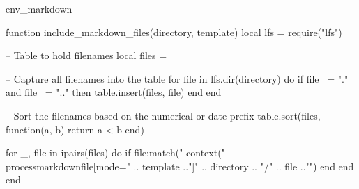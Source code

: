 \startenvironment env_markdown

\startluacode
function include_markdown_files(directory, template)
	local lfs = require("lfs")

	-- Table to hold filenames
	local files = {}

	-- Capture all filenames into the table
	for file in lfs.dir(directory) do
		if file ~= "." and file ~= ".." then
			table.insert(files, file)
		end
	end

	-- Sort the filenames based on the numerical or date prefix
	table.sort(files, function(a, b)
			return a < b
	end)

	for _, file in ipairs(files) do
		if file:match("%
			context("\\processmarkdownfile[mode=" .. template .."]{" .. directory .. "/" .. file .."}")
		end
	end
end
\stopluacode

\usemodule[filter]


\stopenvironment
